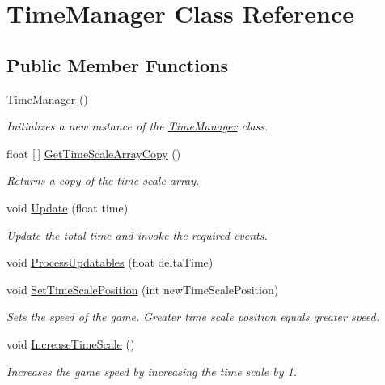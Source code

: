 \hypertarget{class_time_manager}{}\section{Time\+Manager Class Reference}
\label{class_time_manager}
\subsection*{Public Member Functions}
\begin{DoxyCompactItemize}
\item 
\hyperlink{class_time_manager_a77e028375607efbc2f94d83729f73f77}{Time\+Manager} ()
\begin{DoxyCompactList}\small\item\em Initializes a new instance of the \hyperlink{class_time_manager}{Time\+Manager} class. \end{DoxyCompactList}\item 
float \mbox{[}$\,$\mbox{]} \hyperlink{class_time_manager_a4d38aca3fb77a306f12058159418afa5}{Get\+Time\+Scale\+Array\+Copy} ()
\begin{DoxyCompactList}\small\item\em Returns a copy of the time scale array. \end{DoxyCompactList}\item 
void \hyperlink{class_time_manager_a981b6152006a85774eae414e5cfac46c}{Update} (float time)
\begin{DoxyCompactList}\small\item\em Update the total time and invoke the required events. \end{DoxyCompactList}\item 
void \hyperlink{class_time_manager_abc8d4800c8e592ff21eb128f7729e7ec}{Process\+Updatables} (float delta\+Time)
\item 
void \hyperlink{class_time_manager_a13fc95a140feaa5b8dae1b56c9de647e}{Set\+Time\+Scale\+Position} (int new\+Time\+Scale\+Position)
\begin{DoxyCompactList}\small\item\em Sets the speed of the game. Greater time scale position equals greater speed. \end{DoxyCompactList}\item 
void \hyperlink{class_time_manager_ade3342429174a1ddcf2557a03d340211}{Increase\+Time\+Scale} ()
\begin{DoxyCompactList}\small\item\em Increases the game speed by increasing the time scale by 1. \end{DoxyCompactList}\item 

\end{DoxyCompactItemize}
